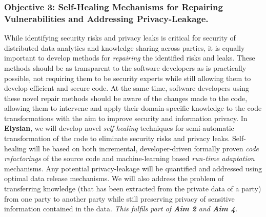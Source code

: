 \documentclass[a4paper,11pt]{article}
\newcommand{\project}[1]{\textbf{#1}\xspace}
\newcommand{\SECURITY}{\project{Elysian}}
\newcommand{\TheProject}{\SECURITY}
\begin{document}
\subsubsection*{Objective 3: Self-Healing Mechanisms for Repairing Vulnerabilities and Addressing Privacy-Leakage.}
While identifying security risks and privacy leaks is critical for security of distributed data analytics and knowledge sharing across parties, it is equally important to develop methods for \emph{repairing} the identified risks and leaks. These methods should be as transparent to the software developers as is practically possible, not requiring them to be security experts while still allowing them to develop efficient and secure code. At the same time, software developers 
using these novel repair methods
should be aware of the changes made to the code, allowing them to intervene and apply their domain-specific knowledge to the code transformations with the aim to improve security and information privacy. In \TheProject{}, we will develop novel \emph{self-healing} techniques for semi-automatic transformation of the code to eliminate security risks and privacy leaks. Self-healing will be based on both incremental, developer-driven formally proven \emph{code refactorings} of the source code and machine-learning based \emph{run-time adaptation} mechanisms. Any potential privacy-leakage will be quantified and addressed using optimal data release mechanisms. We will also address the problem of transferring knowledge (that has been extracted from the private data of a party) from one party to another party while still preserving privacy of sensitive information contained in the data. \emph{This fulfils part of \textbf{Aim 2} and \textbf{Aim 4}.}

\end{document}
